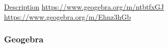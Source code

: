 \documentclass{beamer}
\begin{document}
\begin{extract}
\href{https://www.geogebra.org/m/ydz69yUz}{Description}
\url{https://www.geogebra.org/m/ntbtfxGJ}
\url{https://www.geogebra.org/m/Ehnz3hGb}
\end{extract}

\begin{frame}
\frametitle{Geogebra}
\end{frame}
\end{document}
